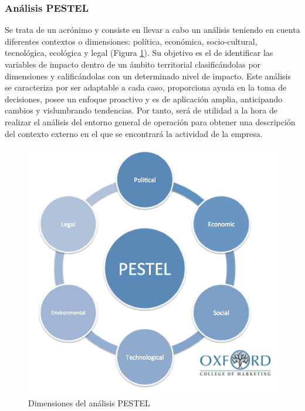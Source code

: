\subsubsection{Análisis PESTEL}
Se trata de un acrónimo \cite{juanmartin2017} y consiste en llevar a cabo un análisis teniendo en cuenta diferentes contextos o dimensiones: política, económica, socio-cultural, tecnológica, ecológica y legal (Figura \ref{fig:pestel}). Su objetivo es el de identificar las variables de impacto dentro de un ámbito territorial clasificándolas por dimensiones y calificándolas con un determinado nivel de impacto. Este análisis se caracteriza por ser adaptable a cada caso, proporciona ayuda en la toma de decisiones, posee un enfoque proactivo y es de aplicación amplia, anticipando cambios y vislumbrando tendencias. Por tanto, será de utilidad a la hora de realizar el análisis del entorno general de operación para obtener una descripción del contexto externo en el que se encontrará la actividad de la empresa.

\begin{figure}[h]
  \centering
  \includegraphics[width=0.5\linewidth]{figures/images/PESTEL-Analysis.png}
  \caption{Dimensiones del análisis PESTEL}
  \label{fig:pestel}
\end{figure}

\clearpage

